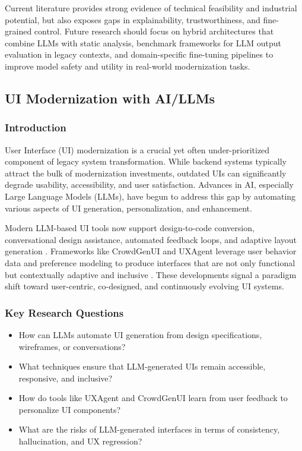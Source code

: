 \documentclass[12pt]{article}
\begin{document}
Current literature provides strong evidence of technical feasibility and industrial potential, but also exposes gaps in explainability, trustworthiness, and fine-grained control. Future research should focus on hybrid architectures that combine LLMs with static analysis, benchmark frameworks for LLM output evaluation in legacy contexts, and domain-specific fine-tuning pipelines to improve model safety and utility in real-world modernization tasks.

\subsection{UI Modernization with AI/LLMs}

\subsubsection{Introduction}

User Interface (UI) modernization is a crucial yet often under-prioritized component of legacy system transformation. While backend systems typically attract the bulk of modernization investments, outdated UIs can significantly degrade usability, accessibility, and user satisfaction. Advances in AI, especially Large Language Models (LLMs), have begun to address this gap by automating various aspects of UI generation, personalization, and enhancement.

Modern LLM-based UI tools now support design-to-code conversion, conversational design assistance, automated feedback loops, and adaptive layout generation \cite{wu2024uicoder, park2024interface}. Frameworks like CrowdGenUI and UXAgent leverage user behavior data and preference modeling to produce interfaces that are not only functional but contextually adaptive and inclusive \cite{liu2024crowdgenui, zhao2024uxagent}. These developments signal a paradigm shift toward user-centric, co-designed, and continuously evolving UI systems.

\subsubsection{Key Research Questions}

\begin{itemize}
    \item How can LLMs automate UI generation from design specifications, wireframes, or conversations?
    \item What techniques ensure that LLM-generated UIs remain accessible, responsive, and inclusive?
    \item How do tools like UXAgent and CrowdGenUI learn from user feedback to personalize UI components?
    \item What are the risks of LLM-generated interfaces in terms of consistency, hallucination, and UX regression?
\end{itemize}
\end{document}
